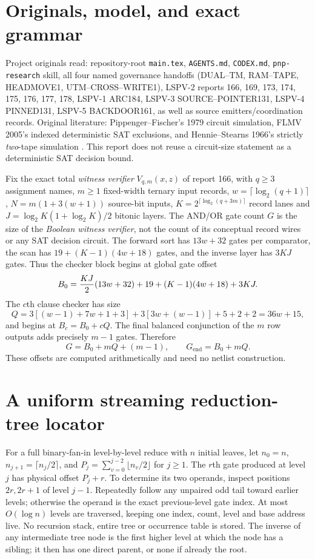 \documentclass[11pt]{article}
\begin{document}
\section{Originals, model, and exact grammar}
Project originals read: repository-root \texttt{main.tex}, \texttt{AGENTS.md},
\texttt{CODEX.md}, \texttt{pnp-research} skill, all four named governance
handoffs (DUAL--TM, RAM--TAPE, HEADMOVE1, UTM--CROSS--WRITE1),
LSPV-2 reports 166, 169, 173, 174, 175, 176, 177, 178,
LSPV-1 ARC184, LSPV-3 SOURCE--POINTER131, LSPV-4 PINNED131,
LSPV-5 BACKDOOR161, as well as source emitters/coordination records.
Original literature: Pippenger--Fischer's 1979 circuit simulation,
FLMV 2005's indexed deterministic SAT exclusions, and
Hennie--Stearns 1966's strictly \emph{two}-tape simulation
\cite{pf,flmv,hs}. This report does not reuse a circuit-size statement
as a deterministic SAT decision bound.

Fix the exact total \emph{witness verifier} $V_{q,m}(x,z)$ of report 166,
with $q\ge3$ assignment names, $m\ge1$ fixed-width ternary input records,
$w=\lceil\log_2(q+1)\rceil$, $N=m(1+3(w+1))$ source-bit inputs,
$K=2^{\lceil\log_2(q+3m)\rceil}$ record lanes and
$J=\log_2 K(1+\log_2 K)/2$ bitonic layers.
The AND/OR gate count $G$ is the size of the \emph{Boolean witness verifier},
not the count of its conceptual record wires or any SAT decision circuit.
The forward sort has $13w+32$ gates per comparator, the scan has
$19+(K-1)(4w+18)$ gates, and the inverse layer has $3KJ$ gates. Thus the
checker block begins at global gate offset
\[
 B_0={KJ\over2}(13w+32)+19+(K-1)(4w+18)+3KJ.
\]
The $c$th clause checker has size
\[
 Q=3[(w-1)+7w+1+3]+3[3w+(w-1)]+5+2+2
   =36w+15,
\]
and begins at $B_c=B_0+cQ$. The final balanced conjunction of the $m$
row outputs adds precisely $m-1$ gates. Therefore
\[
 G=B_0+mQ+(m-1),\qquad G_{\mathrm{end}}=B_0+mQ.
\tag{1}
\]
These offsets are computed arithmetically and need no netlist construction.

\section{A uniform streaming reduction-tree locator}
For a full binary-fan-in level-by-level reduce with $n$ initial leaves,
let $n_0=n$, $n_{j+1}=\lceil n_j/2\rceil$, and
$P_j=\sum_{v=0}^{j-2}\lfloor n_v/2\rfloor$ for $j\ge1$.
The $r$th gate produced at level $j$ has physical offset $P_j+r$.
To determine its two operands, inspect positions $2r,2r+1$ of level
$j-1$. Repeatedly follow any unpaired odd tail toward earlier levels;
otherwise the operand is the exact previous-level gate index.
At most $O(\log n)$ levels are traversed, keeping one index, count,
level and base address live. No recursion stack, entire tree or
occurrence table is stored. The inverse of any intermediate tree node
is the first higher level at which the node has a sibling; it then has
one direct parent, or none if already the root.
\end{document}
